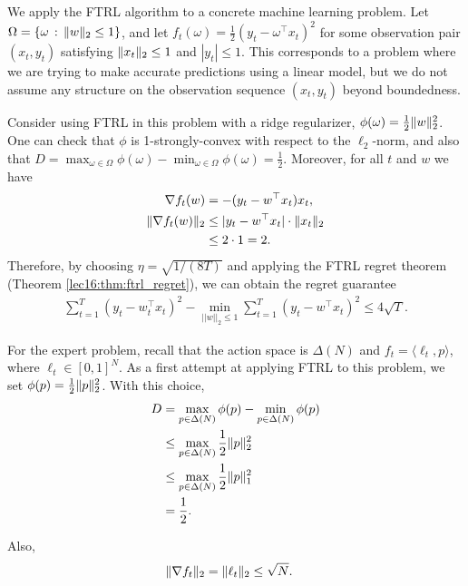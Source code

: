 
We apply the FTRL algorithm to a concrete machine learning problem. Let $\Omega = \{ \omega \, : \, \|w\|_2 \leq 1 \}$, and let $f_t(\omega) = \tfrac{1}{2}(y_t - \omega^{\top} x_t)^2$ for some observation pair $(x_t, y_t)$ satisfying $\|x_t\|_2 \leq 1$ and $|y_t| \leq 1$.  This corresponds to a problem where we are trying to make accurate predictions using a linear model, but we do not assume any structure on the observation sequence $(x_t, y_t)$ beyond boundedness.

Consider using FTRL in this problem with a ridge regularizer, $\phi(\omega) = \tfrac{1}{2} \|w\|_2^2$.  One can check that $\phi$ is 1-strongly-convex with respect to the $\ell_2$-norm, and also that $D = \max_{\omega \in \Omega} \phi(\omega) - \min_{\omega \in \Omega} \phi(\omega) = \tfrac{1}{2}$.  Moreover, for all $t$ and $w$ we have 
\begin{align}
\nabla f_t(w) &= - (y_t - w^\top x_t) x_t, \\
\|\nabla f_t(w)\|_2 &\leq |y_t - w^\top x_t| \cdot \|x_t\|_2 \\
&\leq 2 \cdot 1 = 2.
\end{align}
Therefore, by choosing $\eta = \sqrt{1/(8T)}$ and applying the FTRL regret theorem (Theorem \ref{lec16:thm:ftrl_regret}), we can obtain the regret guarantee
\begin{align}
\sum_{t = 1}^T (y_t - w_t^{\top} x_t)^2 - \min_{|| w ||_2 \leq 1} \sum_{t = 1}^T  (y_t - w^{\top} x_t)^2 \leq 4 \sqrt{T}.
\end{align}


For the expert problem, recall that the action space is $\Delta (N)$ and $f_t = \langle \ell_t , p \rangle$, where $\ell_t \in [0,1]^N$. As a first attempt at applying FTRL to this problem, we set $\phi (p) = \frac{1}{2}\|p\|_2^2$. With this choice,
\begin{align}
D &= \max_{p \in \Delta(N)} \phi (p) - \min_{p \in \Delta(N)} \phi (p) \\
&\leq \max_{p \in \Delta(N)} \frac{1}{2}\|p\|_2^2 \\
&\leq \max_{p \in \Delta(N)} \frac{1}{2}\|p\|_1^2 \\
&= \frac{1}{2}.
\end{align}

Also,
\begin{align}
\|\nabla f_t\|_2 &= \|\ell_t\|_2 \leq \sqrt{N}.
\end{align}

